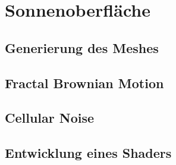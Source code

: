 \section{Sonnenoberfläche}
\subsection{Generierung des Meshes} 
\subsection{Fractal Brownian Motion}
\subsection{Cellular Noise}
\subsection{Entwicklung eines Shaders}

